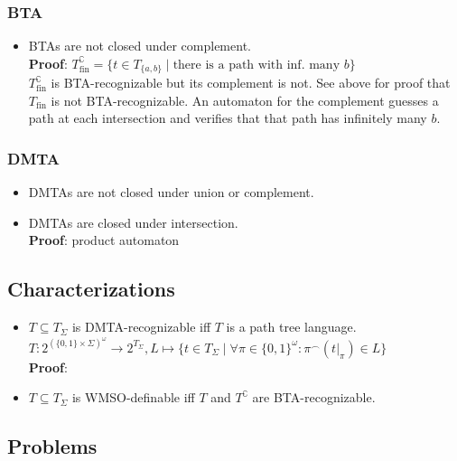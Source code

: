 \documentclass{article}
\begin{document}
\subsubsection{BTA}
\begin{itemize}
	\item BTAs are not closed under complement. \\
		\textbf{Proof}: $T_\text{fin}^\complement = \{ t \in T_{\{a,b\}} \mid \text{there is a path with inf. many } b \}$ \\
		$T_\text{fin}^\complement$ is BTA-recognizable but its complement is not. See above for proof that $T_\text{fin}$ is not BTA-recognizable. An automaton for the complement guesses a path at each intersection and verifies that that path has infinitely many $b$.
\end{itemize}

\subsubsection{DMTA}
\begin{itemize}
	\item DMTAs are not closed under union or complement. %
	\item DMTAs are closed under intersection. \\
		\textbf{Proof}: product automaton
\end{itemize}

\subsection{Characterizations}
\begin{itemize}
	\item $T \subseteq T_\Sigma$ is DMTA-recognizable iff $T$ is a path tree language. \\
		$T : 2^{(\{0,1\} \times \Sigma)^\omega} \rightarrow 2^{T_\Sigma}, L \mapsto \{ t \in T_\Sigma \mid \forall \pi \in \{0,1\}^\omega: \pi^\smallfrown (t|_\pi) \in L \}$ \\
		\textbf{Proof}: %
	\item $T \subseteq T_\Sigma$ is WMSO-definable iff $T$ and $T^\complement$ are BTA-recognizable. %
\end{itemize}

\subsection{Problems}
\end{document}
